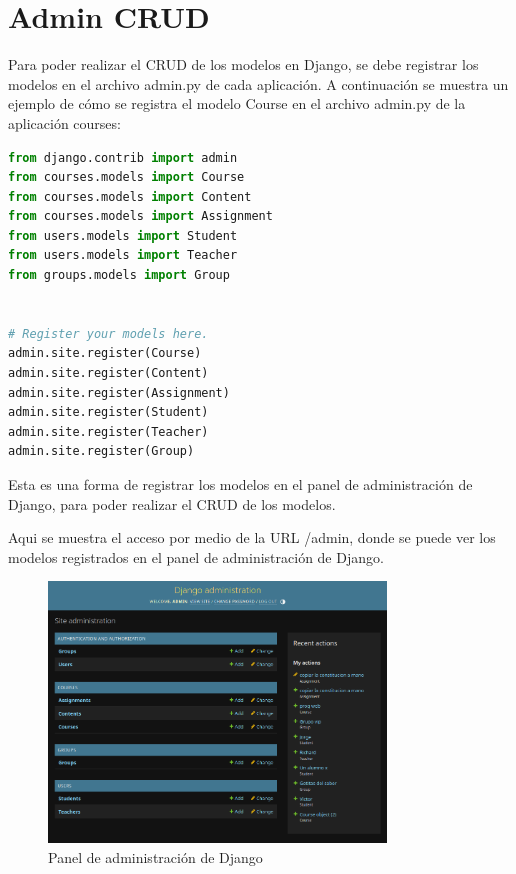 \section{Admin CRUD}
Para poder realizar el CRUD de los modelos en Django, se debe registrar los modelos en el archivo admin.py de cada aplicación. A continuación se muestra un ejemplo de cómo se registra el modelo Course en el archivo admin.py de la aplicación courses:

\begin{lstlisting}[language=Python]
from django.contrib import admin
from courses.models import Course
from courses.models import Content
from courses.models import Assignment
from users.models import Student
from users.models import Teacher
from groups.models import Group


# Register your models here.
admin.site.register(Course)
admin.site.register(Content)
admin.site.register(Assignment)
admin.site.register(Student)
admin.site.register(Teacher)
admin.site.register(Group)
\end{lstlisting}

Esta es una forma de registrar los modelos en el panel de administración de Django, para poder realizar el CRUD de los modelos.

Aqui se muestra el acceso por medio de la URL /admin, donde se puede ver los modelos registrados en el panel de administración de Django.

\begin{figure}[H]
  \centering
  \includegraphics[width=0.8\textwidth]{img/admin.png}
  \caption{Panel de administración de Django}
\end{figure}

